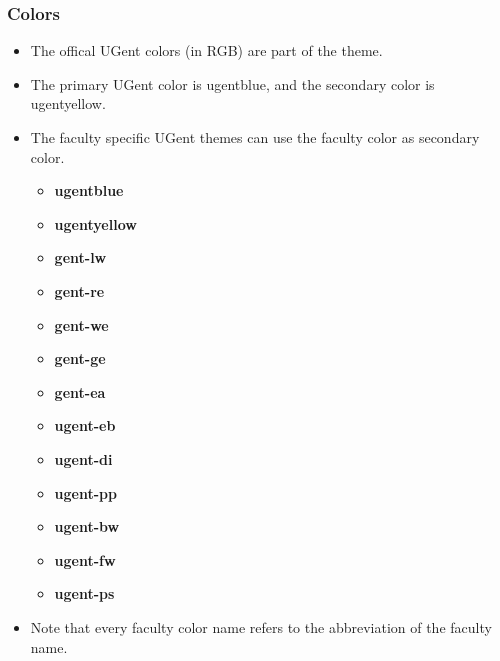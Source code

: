 \documentclass[aspectratio=169]{beamer}
\begin{document}
\begin{frame}
    \frametitle{Colors}
    \begin{itemize}
        \item The offical UGent colors (in RGB)  are part of the theme.
        \item The primary UGent color is {\color{ugentblue} ugentblue}, and the secondary color is {\color{ugentyellow} ugentyellow}.
        \item The faculty specific UGent themes can use the faculty color as secondary color.
            \begin{center}
                \begin{minipage}[t]{.35\textwidth}
                    \begin{itemize}
                        \item {\color{ugentblue}  \textbf{ugentblue}}
                        \item {\color{ugentyellow}\textbf{ugentyellow}}
                        \item {\color{ugent-lw}   \textbf{gent-lw}}
                        \item {\color{ugent-re}   \textbf{gent-re}}
                        \item {\color{ugent-we}   \textbf{gent-we}}
                        \item {\color{ugent-ge}   \textbf{gent-ge}}
                        \item {\color{ugent-ea}   \textbf{gent-ea}}
                    \end{itemize}
                \end{minipage}%
                \begin{minipage}[t]{.35\textwidth}
                    \begin{itemize}
                        \item {\color{ugent-eb} \textbf{ugent-eb}}
                        \item {\color{ugent-di} \textbf{ugent-di}}
                        \item {\color{ugent-pp} \textbf{ugent-pp}}
                        \item {\color{ugent-bw} \textbf{ugent-bw}}
                        \item {\color{ugent-fw} \textbf{ugent-fw}}
                        \item {\color{ugent-ps} \textbf{ugent-ps}}
                    \end{itemize}
                \end{minipage}
                \vspace{.5cm}
            \end{center}
        \item Note that every faculty color name refers to the abbreviation of the faculty name.
    \end{itemize}
\end{frame}
\end{document}
